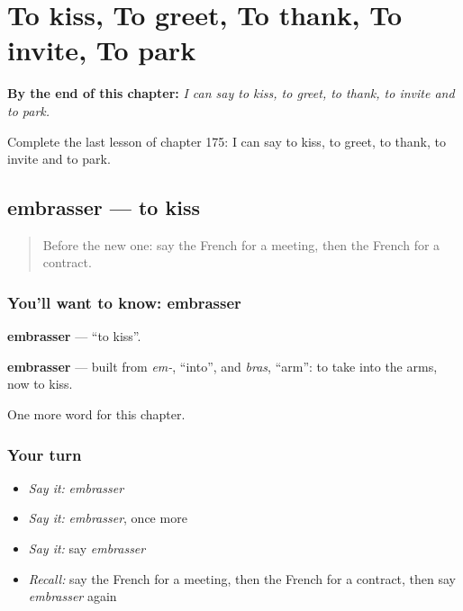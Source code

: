
\chapter{To kiss, To greet, To thank, To invite, To park}
\label{ch:fr-to-kiss-to-greet-to-thank-to-invite-to-park}

\begin{chapteropening}
\textbf{By the end of this chapter:} \emph{I can say to kiss, to greet, to thank, to invite and to park.}

Complete the last lesson of chapter 175: I can say to kiss, to greet, to thank, to invite and to park.
\end{chapteropening}

\section[embrasser]{embrasser — to kiss}

\label{lesson:FR-C175-embrasser}



\begin{quote}
Before the new one: say the French for a meeting, then the French for a contract.
\end{quote}

\subsection*{You'll want to know: embrasser}
\textbf{embrasser} — \textquotedblleft{}to kiss\textquotedblright{}.

\begin{cousinweb}
\textbf{embrasser} — built from \emph{em-}, \textquotedblleft{}into\textquotedblright{}, and \emph{bras}, \textquotedblleft{}arm\textquotedblright{}: to take into the arms, now to kiss.
\end{cousinweb}

\begin{grammarlens}[title={What you've built}]
One more word for this chapter.
\end{grammarlens}

\subsection*{Your turn}
\begin{itemize}
\raggedright
  \item \emph{Say it:} \emph{embrasser}
  \item \emph{Say it:} \emph{embrasser}, once more
  \item \emph{Say it:} say \emph{embrasser}
  \item \emph{Recall:} say the French for a meeting, then the French for a contract, then say \emph{embrasser} again
\end{itemize}

